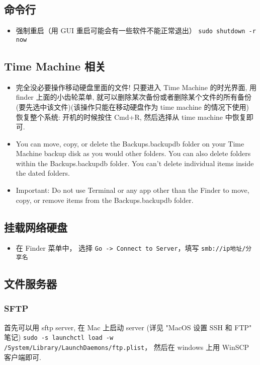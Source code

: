 \subsection{命令行}
\begin{itemize}
\item 强制重启（用 GUI 重启可能会有一些软件不能正常退出） \verb|sudo shutdown -r now|
\end{itemize}

\subsection{Time Machine 相关}
\begin{itemize}
\item 完全没必要操作移动硬盘里面的文件! 只要进入 Time Machine 的时光界面, 用 finder 上面的小齿轮菜单, 就可以删除某次备份或者删除某个文件的所有备份 (要先选中该文件)(该操作只能在移动硬盘作为 time machine 的情况下使用)
恢复整个系统: 开机的时候按住 Cmd+R, 然后选择从 time machine 中恢复即可.
\item You can move, copy, or delete the Backups.backupdb folder on your Time Machine backup disk as you would other folders. You can also delete folders within the Backups.backupdb folder. You can’t delete individual items inside the dated folders.
\item Important: Do not use Terminal or any app other than the Finder to move, copy, or remove items from the Backups.backupdb folder.
\end{itemize}

\subsection{挂载网络硬盘}
\begin{itemize}
\item 在 Finder 菜单中， 选择 \verb`Go -> Connect to Server`，填写 \verb`smb://ip地址/分享名`
\end{itemize}

\subsection{文件服务器}
\subsubsection{SFTP}
首先可以用 sftp server, 在 Mac 上启动 server (详见 "MacOS 设置 SSH 和 FTP" 笔记)
\verb|sudo -s launchctl load -w /System/Library/LaunchDaemons/ftp.plist|， 然后在 windows 上用 WinSCP 客户端即可.

